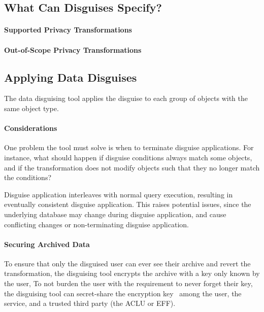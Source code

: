 
\subsection{What Can Disguises Specify?}

\paragraph{Supported Privacy Transformations}

\paragraph{Out-of-Scope Privacy Transformations}

\subsection{Applying Data Disguises}
The data disguising tool applies the disguise to each group of objects with the same object type.

\paragraph{Considerations}
One problem the tool must solve is when to terminate disguise applications. For instance, what
should happen if disguise conditions always match some objects, and if the transformation
does not modify objects such that they no longer match the conditions?

Disguise application interleaves with normal query execution, resulting in eventually consistent
disguise application. This raises potential issues, since the underlying database may change during
disguise application, and cause conflicting changes or non-terminating disguise application.

\paragraph{Securing Archived Data}
To ensure that only the disguised user can ever see their archive and revert the transformation, the disguising tool
encrypts the archive with a key only known by the user, To not burden the user with the requirement to never
forget their key, the disguising tool can secret-share the encryption key~\cite{secretsharing} among the
user, the service, and a trusted third party (\eg the ACLU or EFF).
